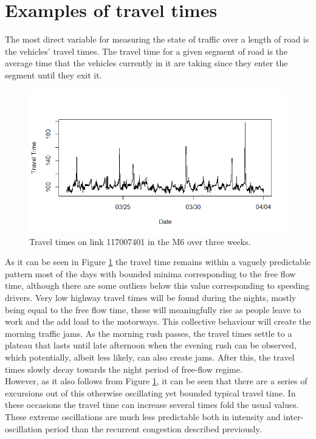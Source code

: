 \documentclass[conference, letterpaper]{IEEEtran}
\begin{document}
\section{Examples of travel times} 
The most direct variable for measuring the state of traffic over a length of road is the vehicles' travel times. 
The travel time for a given segment of road is the average time that the vehicles currently in it are taking since they enter the segment until they exit it.\\

\begin{figure}[htbp]
	\centerline{\includegraphics[width=\linewidth]{./images/Traveltime_example.png}}
	\caption{Travel times on link 117007401 in the M6 over three weeks.}
	\label{fig:travel_time_example}
\end{figure}

As it can be seen in Figure \ref{fig:travel_time_example} the travel time remains within a vaguely predictable pattern most of the days with bounded minima corresponding to the free flow time, although there are some outliers below this value corresponding to speeding drivers. 
Very low highway travel times will be found during the nights, mostly being equal to the free flow time, these will meaningfully rise as people leave to work and the add load to the motorways. 
This collective behaviour will create the morning traffic jams. 
As the morning rush passes, the travel times settle to a plateau that lasts until late afternoon when the evening rush can be observed, which potentially, albeit less likely, can also create jams. 
After this, the travel times slowly decay towards the night period of free-flow regime.\\

However, as it also follows from Figure \ref{fig:travel_time_example}, it can be seen that there are a series of excursions out of this otherwise oscillating yet bounded typical travel time. 
In these occasions the travel time can increase several times fold the usual values. These extreme oscillations are much less predictable both in intensity and inter-oscillation period than the recurrent congestion described previously.
 
\end{document}
